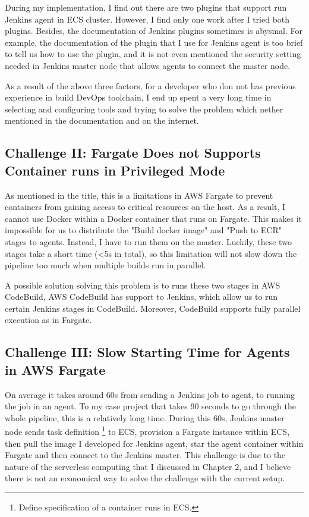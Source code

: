 During my implementation, I find out there are two plugins that support run Jenkins agent in ECS cluster. However, I find only one work after I tried both plugins. Besides, the documentation of Jenkins plugins sometimes is abysmal. For example, the documentation of the plugin that I use for Jenkins agent is too brief to tell us how to use the plugin, and it is not even mentioned the security setting needed in Jenkins master node that allows agents to connect the master node. 
\par
As a result of the above three factors, for a developer who don not has previous experience in build DevOps toolchain, I end up spent a very long time in selecting and configuring tools and trying to solve the problem which nether mentioned in the documentation and on the internet. 
\subsection{Challenge II: Fargate Does not Supports Container runs in Privileged Mode}
As mentioned in the title, this is a limitations in AWS Fargate to prevent containers from gaining access to critical resources on the host. As a result, I cannot use Docker within a Docker container that runs on Fargate. This makes it impossible for us to distribute the "Build docker image" and "Push to ECR" stages to agents. Instead, I have to run them on the master. Luckily, these two stages take a short time (<5s in total), so this limitation will not slow down the pipeline too much when multiple builds run in parallel.
\par
A possible solution solving this problem is to runs these two stages in AWS CodeBuild, AWS CodeBuild has support to Jenkins, which allow us to run certain Jenkins stages in CodeBuild. Moreover, CodeBuild supports fully parallel execution as in Fargate.
\subsection{Challenge III: Slow Starting Time for Agents in AWS Fargate}
On average it takes around 60s from sending a Jenkins job to agent, to running the job in an agent. To my case project that takes 90 seconds to go through the whole pipeline, this is a relatively long time. During this 60s, Jenkins master node sends task definition \footnote{Define specification of a container runs in ECS.} to ECS, provision a Fargate instance within ECS, then pull the image I developed for Jenkins agent, star the agent container within Fargate and then connect to the Jenkins master. This challenge is due to the nature of the serverless computing that I discussed in Chapter 2, and I believe there is not an economical way to solve the challenge with the current setup.
